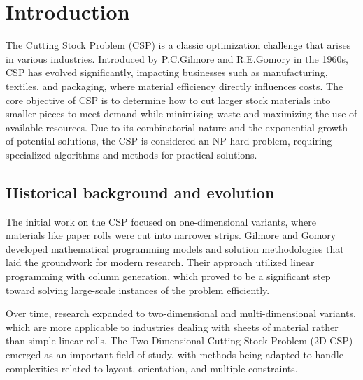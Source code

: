 \documentclass[a4paper]{article}
\begin{document}
\setcounter{page}{0}
\thispagestyle{empty}
\newpage
\tableofcontents
\newpage

\section{Introduction}
The Cutting Stock Problem (CSP) is a classic optimization challenge that arises in various industries. Introduced by P.C.Gilmore and R.E.Gomory in the 1960s, CSP has evolved significantly, impacting businesses such as manufacturing, textiles, and packaging, where material efficiency directly influences costs. The core objective of CSP is to determine how to cut larger stock materials into smaller pieces to meet demand while minimizing waste and maximizing the use of available resources. Due to its combinatorial nature and the exponential growth of potential solutions, the CSP is considered an NP-hard problem, requiring specialized algorithms and methods for practical solutions. 
\subsection{Historical background and evolution}
The initial work on the CSP focused on one-dimensional variants, where materials like paper rolls were cut into narrower strips. Gilmore and Gomory developed mathematical programming models and solution methodologies that laid the groundwork for modern research. Their approach utilized linear programming with column generation, which proved to be a significant step toward solving large-scale instances of the problem efficiently.

Over time, research expanded to two-dimensional and multi-dimensional variants, which are more applicable to industries dealing with sheets of material rather than simple linear rolls. The Two-Dimensional Cutting Stock Problem (2D CSP) emerged as an important field of study, with methods being adapted to handle complexities related to layout, orientation, and multiple constraints.
\end{document}
